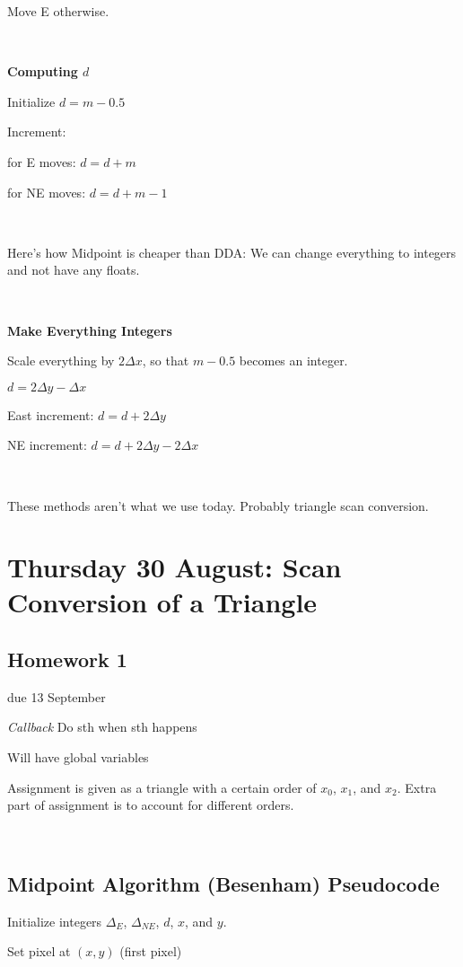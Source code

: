\documentclass[12pt]{article}
\begin{document}
\begin{spacing}{1.2}
Move E otherwise.  

\

{\bf Computing $d$}

Initialize $d = m - 0.5$

Increment:

\qquad for E moves:  $d = d+m$

\qquad for NE moves:  $d = d + m - 1$

\

Here's how Midpoint is cheaper than DDA:  We can change everything to integers and not have any floats.  

\

{\bf Make Everything Integers}

Scale everything by $2 \Delta x$, so that $m - 0.5$ becomes an integer.  

$d = 2 \Delta y - \Delta x$

East increment:  $d = d + 2 \Delta y$

NE increment:  $d = d + 2 \Delta y - 2 \Delta x$

\

These methods aren't what we use today.  Probably triangle scan conversion.  

\section{Thursday 30 August:  Scan Conversion of a Triangle}

\subsection{Homework 1} due 13 September

{\it Callback}  Do sth when sth happens

Will have global variables

Assignment is given as a triangle with a certain order of $x_0$, $x_1$, and $x_2$.  Extra part of assignment is to account for different orders.  

\

\subsection{Midpoint Algorithm (Besenham) Pseudocode}

Initialize integers $\Delta_E$, $\Delta_{NE}$, $d$, $x$, and $y$.  

Set pixel at $(x,y)$ (first pixel)


\end{spacing}
\end{document}
